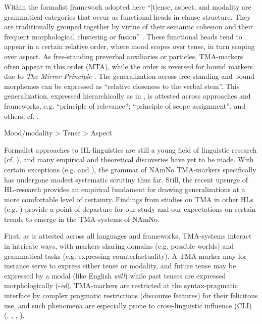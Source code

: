 \documentclass[output=paper]{langscibook}
\begin{document}
Within the formalist framework adopted here “[t]ense, aspect, and modality are grammatical categories that occur as functional heads in clause structure. They are traditionally grouped together by virtue of their semantic cohesion and their frequent morphological clustering or fusion” \citep[746]{Zagona2013}. These functional heads tend to appear in a certain relative order, where mood scopes over tense, in turn scoping over aspect. As free\hyp standing preverbal auxiliaries or particles, TMA-markers often appear in this order (MTA), while the order is reversed for bound markers due to \textit{The Mirror Principle} \citep{Baker1985}. The generalization across free-standing and bound morphemes can be expressed as “relative closeness to the verbal stem”. This generalization, expressed hierarchically as in , is attested across approaches and frameworks, e.g.  “principle of relevance”;  “principle of scope assignment”, and others, cf. \citet{Cinque2014}. 

\ea\label{ex:eide:1} Mood/modality > Tense > Aspect\z

Formalist approaches to HL-linguistics are still a young field of linguistic research (cf. ), and many empirical and theoretical discoveries have yet to be made. With certain exceptions (e.g. \citealt{EideHjelde2012, EideHjelde2015Borrowing, EideHjelde2015Verb, EideHjelde2018, Eide2019, EikLaanemets2021} and \citealt{Lykke2020,Lykke2022}), the grammar of NAmNo TMA-markers specifically has undergone modest systematic scrutiny thus far. Still, the recent upsurge of HL-research provides an empirical fundament for drawing generalizations at a more comfortable level of certainty. Findings from studies on TMA in other HLs (e.g.  \citealt{Montrul2009, Montrul2016, RodriguezBrandl2019, CorbetDominguez2020, Laleko2008, Laleko2010}) provide a point of departure for our study and our expectations on certain trends to emerge in the TMA-systems of NAmNo. 

First, as is attested across all languages and frameworks, TMA-systems interact in intricate ways, with markers sharing domains (e.g. possible worlds) and grammatical tasks (e.g. expressing counterfactuality). A TMA-marker may for instance serve to express either tense or modality, and future tense may be expressed by a modal (like English \textit{will}) while past tenses are expressed morphologically (-\textit{ed}). TMA-markers are restricted at the syntax-pragmatic interface by complex pragmatic restrictions (discourse features) for their felicitous use, and such phenomena are especially prone to cross-linguistic influence (CLI) (\citealt{CasalicchioMoroni2023, Sorace2004}, \citealt{TsimpliSorace2006}, \citealt{SoraceSerratrice2009}, \citealt{Sorace2011}).  
\end{document}
